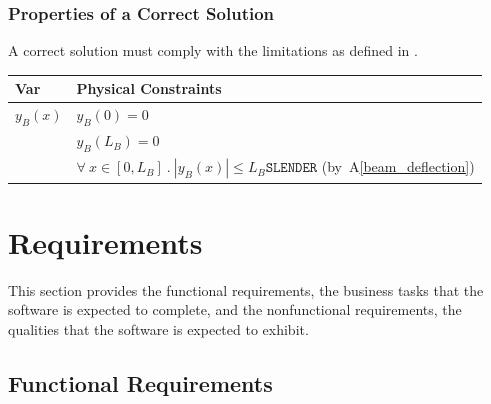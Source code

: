 \documentclass[12pt]{article}
\newcommand{\aref}[1]{A\ref{#1}}
\begin{document}
\subsubsection{Properties of a Correct Solution}
\label{sec_CorrectSolution}

\noindent{}A correct solution must comply with the limitations as defined in
.

\begin{table}[H]
    \caption{Output Variables}
    \label{TblOutputVar}
    \renewcommand{\arraystretch}{1.2}
    \noindent
    \begin{longtable}{l l}
        \toprule
        \textbf{Var} & \textbf{Physical Constraints}                                                               \\
        \midrule
        $y_{B}(x)$   & $y_B(0) = 0$                                                                                \\
                     & $y_B(L_B) = 0$                                                                              \\
                     & $\forall~x \in [0, L_B]~.~|y_{B}(x)| \leq L_B \texttt{SLENDER}$ (by~\aref{beam_deflection}) \\
        \bottomrule
    \end{longtable}
\end{table}



\section{Requirements}

This section provides the functional requirements, the business tasks that the
software is expected to complete, and the nonfunctional requirements, the
qualities that the software is expected to exhibit.

\subsection{Functional Requirements}
\end{document}
